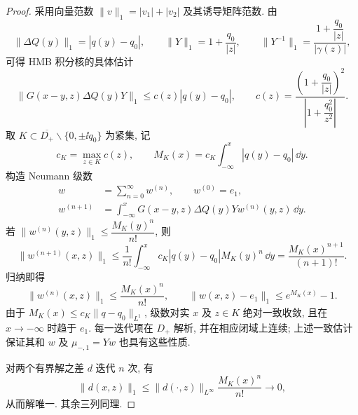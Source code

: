\begin{proof}
采用向量范数 $\|v\|_1=|v_1|+|v_2|$ 及其诱导矩阵范数. 由
\[
\|\Delta Q(y)\|_1=|q(y)-q_0|,\qquad
\|Y\|_1=1+\dfrac{q_0}{|z|},\qquad
\|Y^{-1}\|_1=\dfrac{1+\dfrac{q_0}{|z|}}{|\gamma(z)|},
\]
可得 HMB 积分核的具体估计
\begin{equation}\label{eq:jost-kernel-estimate}
\|G(x-y,z)\Delta Q(y)Y\|_1
\le c(z)|q(y)-q_0|,\qquad
c(z)=\dfrac{\left(1+\dfrac{q_0}{|z|}\right)^2}{\left|1+\dfrac{q_0^2}{z^2}\right|}.
\end{equation}
取 $K\subset\overline{D_+}\mathbin{\backslash}\{0,\pm\ii q_0\}$ 为紧集, 记
\[
c_{K}=\max\limits_{z\in K}c(z),\qquad
M_{K}(x)=c_{K}\int_{-\infty}^{x}|q(y)-q_0|\,\dd y.
\]
构造 Neumann 级数
\begin{equation}\label{eq:jost-neumann}
\begin{aligned}
w&=\sum\limits_{n=0}^{\infty}w^{(n)},\qquad w^{(0)}=e_1,\\
w^{(n+1)}&=\int_{-\infty}^{x}G(x-y,z)\Delta Q(y)Yw^{(n)}(y,z)\,\dd y.
\end{aligned}
\end{equation}
若 $\|w^{(n)}(y,z)\|_1\le \dfrac{M_{K}(y)^n}{n!}$, 则
\[
\|w^{(n+1)}(x,z)\|_1\le\dfrac{1}{n!}\int_{-\infty}^{x}c_{K}|q(y)-q_0|M_{K}(y)^n\,\dd y
=\dfrac{M_{K}(x)^{n+1}}{(n+1)!}.
\]
归纳即得
\begin{equation}\label{eq:jost-factorial}
\|w^{(n)}(x,z)\|_1\le\dfrac{M_{K}(x)^n}{n!},\qquad
\|w(x,z)-e_1\|_1\le e^{M_{K}(x)}-1.
\end{equation}
由于 $M_{K}(x)\le c_{K}\|q-q_0\|_{L^1}$, 级数对实 $x$ 及 $z\in K$ 绝对一致收敛, 且在 $x\to-\infty$ 时趋于 $e_1$. 每一迭代项在 $D_+$ 解析, 并在相应闭域上连续; 上述一致估计保证其和 $w$ 及 $\mu_{-,1}=Yw$ 也具有这些性质.

对两个有界解之差 $d$ 迭代 $n$ 次, 有
\[
\|d(x,z)\|_1\le\|d(\cdot,z)\|_{L^\infty}\dfrac{M_{K}(x)^n}{n!}\longrightarrow0,
\]
从而解唯一. 其余三列同理.
\end{proof}

